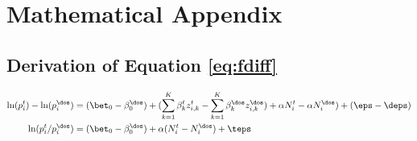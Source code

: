 
\section{Mathematical Appendix}
\subsection{Derivation of Equation \ref{eq:fdiff}}
\begin{align*}
\ln (p^t_{i} ) - \ln ( p^\dos_i) & = (\bet_0 - \beta^\dos_0) +( \sum^K_{k=1}\beta^t_k z^t_{i,k}- \sum^K_{k=1}\beta^{\dos}_k z^\dos_{i,k} )  + \alpha N_i^t -\alpha N_i^\dos) + ( \eps -\deps)\\
\ln (p^t_{i} / p^\dos_i) & = (\bet_0 - \beta^\dos_0)  + \alpha (N_i^t - N_i^\dos) + \teps 
\end{align*}